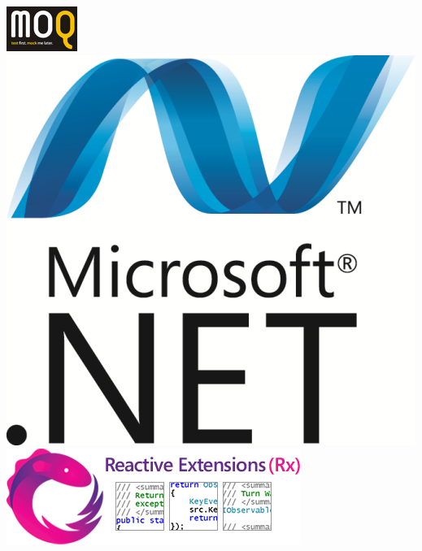\documentclass[t]{beamer}
\begin{document}
\begin{frame}
    \includegraphics[scale=0.6]{img/moq}~\\
    \vspace{0.5cm} \hspace{0.5cm} \includegraphics[scale=0.24]{img/net} \hspace{0.8cm}
    \includegraphics[scale=0.6]{img/rx}

\end{frame}
\end{document}
